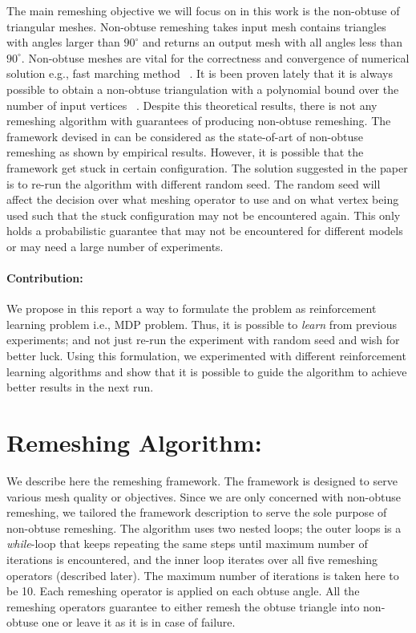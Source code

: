 \documentclass[a4paper,10pt]{article}
\begin{document}
The main remeshing objective we will focus on in this work is the non-obtuse of triangular meshes. Non-obtuse remeshing takes input mesh contains triangles with angles larger than $90^{\circ}$ and returns an output mesh with all angles less than $90^{\circ}$. Non-obtuse meshes are vital for the correctness and convergence of numerical solution e.g., fast marching method ~\citep{yan2016non}. It is been proven lately that it is always possible to obtain a non-obtuse triangulation with a polynomial bound over the number of input vertices ~\citep{Bishop2016}. Despite this theoretical results, there is not any remeshing algorithm with guarantees of producing non-obtuse remeshing. The framework devised in \citep{Abdelkader:2017:ACR} can be considered as the state-of-art of non-obtuse remeshing as shown by empirical results. However, it is possible that the framework get stuck in certain configuration. The solution suggested in the paper is to re-run the algorithm with different random seed. The random seed will affect the decision over what meshing operator to use and on what vertex being used such that the stuck configuration may not be encountered again. This only holds a probabilistic guarantee that may not be encountered for different models or may need a large number of experiments. 

\paragraph{Contribution:} We propose in this report a way to formulate the problem as reinforcement learning problem i.e., MDP problem. Thus, it is possible to \emph{learn} from previous experiments; and not just re-run the experiment with random seed and wish for better luck. Using this formulation, we experimented with different reinforcement learning algorithms and show that it is possible to guide the algorithm to achieve better results in the next run. 

\section{Remeshing Algorithm:}
We describe here the remeshing framework. The framework is designed to serve various mesh quality or objectives. Since we are only concerned with non-obtuse remeshing, we tailored the framework description to serve the sole purpose of non-obtuse remeshing. The algorithm uses two nested loops; the outer loops is a \emph{while}-loop that keeps repeating the same steps until maximum number of iterations is encountered, and the inner loop iterates over all five remeshing operators (described later). The maximum number of iterations is taken here to be 10. Each remeshing operator is applied on each obtuse angle. All the remeshing operators guarantee to either remesh the obtuse triangle into non-obtuse one or leave it as it is in case of failure. 
\end{document}
